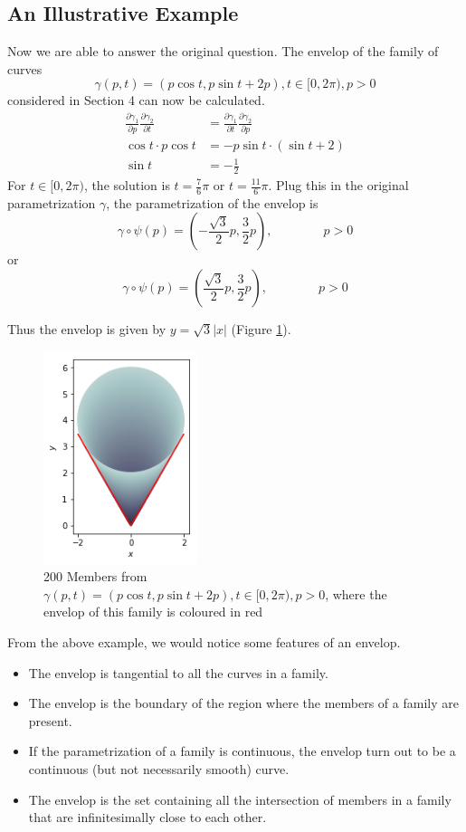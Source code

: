 \documentclass[a4paper]{article}
\begin{document}
\subsection{An Illustrative Example}
Now we are able to answer the original question. The envelop of the family of curves
$$\gamma(p,t) = (p \cos t, p\sin t + 2p), t \in [0,2\pi), p>0$$
considered in Section 4 can now be calculated.
\begin{align*}
\frac{\partial \gamma_1}{\partial p}\frac{\partial \gamma_2}{\partial t} &= \frac{\partial \gamma_1}{\partial t}\frac{\partial \gamma_2}{\partial p}\\
\cos t \cdot p\cos t &= -p \sin t\cdot(\sin t +2)\\
\sin t &= -\frac{1}{2}
\end{align*}
For $t \in [0,2\pi)$, the solution is $t = \frac{7}{6}\pi$ or $t = \frac{11}{6}\pi$. Plug this in the original parametrization $\gamma$, the parametrization of the envelop is
$$\gamma \circ \psi(p) = (-\frac{\sqrt{3}}{2}p,\frac{3}{2}p), \qquad\qquad p>0$$
or
$$\gamma \circ \psi(p) = (\frac{\sqrt{3}}{2}p,\frac{3}{2}p), \qquad\qquad p>0$$

Thus the envelop is given by $y = \sqrt{3}\vert x \vert$ (Figure \ref{fig:envelop}).

\begin{figure}[!htbp]
	\centering
	\includegraphics[width=0.4\textwidth]{family_200_envelop.png}
	\caption{200 Members from $\gamma(p,t) = (p \cos t, p\sin t + 2p), t \in [0,2\pi), p>0$, where the envelop of this family is coloured in red}
	\label{fig:envelop}
\end{figure}

From the above example, we would notice some features of an envelop.
\begin{itemize}
\item The envelop is tangential to all the curves in a family.
\item The envelop is the boundary of the region where the members of a family are present.
\item If the parametrization of a family is continuous, the envelop turn out to be a continuous (but not necessarily smooth) curve.
\item The envelop is the set containing all the intersection of members in a family that are infinitesimally close to each other.
\end{itemize}
\end{document}
